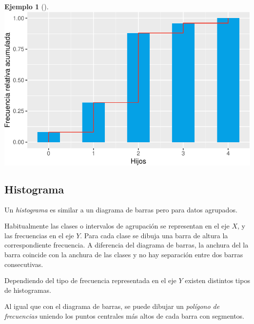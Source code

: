 \documentclass[
  a4paper,
]{scrreport}
\theoremstyle{plain}
\theoremstyle{definition}
\newtheorem{example}{Ejemplo}[chapter]
\theoremstyle{definition}
\theoremstyle{remark}
\begin{document}
\begin{example}[]
\includegraphics{02-estadistica-descriptiva_files/figure-pdf/poligono-relativas-acumuladas-1.pdf}

\end{example}

\subsection{Histograma}\label{histograma}

Un \emph{histograma} es similar a un diagrama de barras pero para datos
agrupados.

Habitualmente las clases o intervalos de agrupación se representan en el
eje \(X\), y las frecuencias en el eje \(Y\). Para cada clase se dibuja
una barra de altura la correspondiente frecuencia. A diferencia del
diagrama de barras, la anchura del la barra coincide con la anchura de
las clases y no hay separación entre dos barras consecutivas.

Dependiendo del tipo de frecuencia representada en el eje \(Y\) existen
distintos tipos de histogramas.

Al igual que con el diagrama de barras, se puede dibujar un
\emph{polígono de frecuencias} uniendo los puntos centrales más altos de
cada barra con segmentos.
\end{document}
